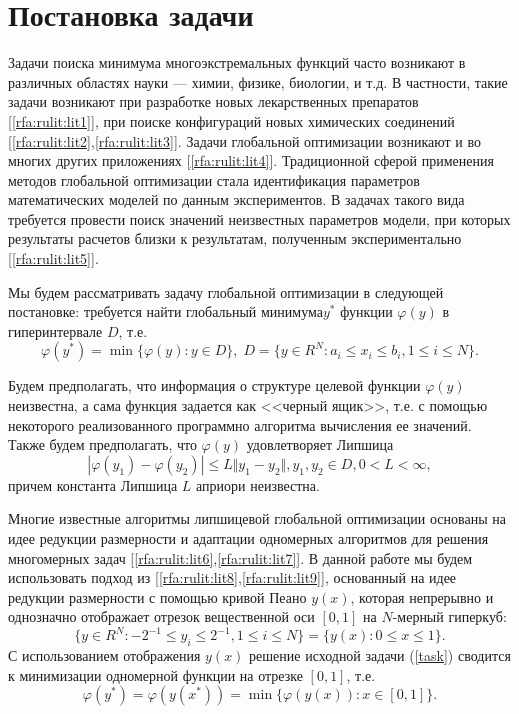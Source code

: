 \documentclass[10pt,a4paper]{book}
\begin{document}
\MakeArticleHeader

\pagebreak



\section{Постановка задачи}

Задачи поиска минимума многоэкстремальных функций часто возникают в различных областях науки --- химии, физике, биологии, и т.д. В частности, такие задачи возникают при разработке новых лекарственных препаратов [\ref{rfa:rulit:lit1}], при поиске конфигураций новых химических соединений [\ref{rfa:rulit:lit2},\ref{rfa:rulit:lit3}]. Задачи глобальной оптимизации возникают и во многих других приложениях [\ref{rfa:rulit:lit4}]. Традиционной сферой применения методов глобальной оптимизации стала идентификация параметров математических моделей по данным экспериментов. В задачах такого вида требуется провести поиск значений неизвестных параметров модели, при которых результаты расчетов близки к результатам, полученным экспериментально [\ref{rfa:rulit:lit5}].

Мы будем рассматривать задачу глобальной оптимизации в следующей постановке: требуется найти глобальный минимума$y^*$ функции $\varphi(y)$ в гиперинтервале $D$, т.е. 
\begin{equation}
\label{task}
\varphi(y^*)=\min\{\varphi(y):y\in D\}, \; D=\{y\in R^N:a_i\leq x_i\leq{b_i}, 1\leq{i}\leq{N}\}.
\end{equation}

Будем предполагать, что информация о структуре целевой функции $\varphi(y)$ неизвестна, а сама функция задается как <<черный ящик>>, т.е. с помощью некоторого реализованного программно алгоритма вычисления ее значений. Также будем предполагать, что $\varphi(y)$ удовлетворяет Липшица 
\begin{equation}
\label{lip}
|\varphi(y_1)-\varphi(y_2)|\leq L\Vert y_1-y_2\Vert,y_1,y_2\in D,0<L<\infty,
\end{equation}
причем константа Липшица $L$ априори неизвестна.

Многие известные алгоритмы липшицевой глобальной оптимизации основаны на идее редукции размерности и адаптации одномерных алгоритмов для решения многомерных задач [\ref{rfa:rulit:lit6},\ref{rfa:rulit:lit7}]. 
В данной работе мы будем использовать подход из [\ref{rfa:rulit:lit8},\ref{rfa:rulit:lit9}], основанный на идее редукции размерности с помощью кривой Пеано  
$y(x)$, которая непрерывно и однозначно отображает отрезок вещественной оси $[0,1]$ на $N$-мерный гиперкуб:
\begin{equation}
\label{cube}
\lbrace y\in R^N:-2^{-1}\leq y_i\leq 2^{-1}, 1\leq i\leq N\rbrace=\{y(x): 0\leq x\leq 1\}.
\end{equation}
С использованием отображения $y(x)$ решение исходной задачи (\ref{task}) сводится к минимизации одномерной функции на отрезке $[0,1]$, т.е.
\begin{equation}
\label{oneDimTask}
\varphi(y^*)=\varphi(y(x^*))=\min\{\varphi(y(x)): x\in [0,1]\}.
\end{equation}
 
\end{document}
